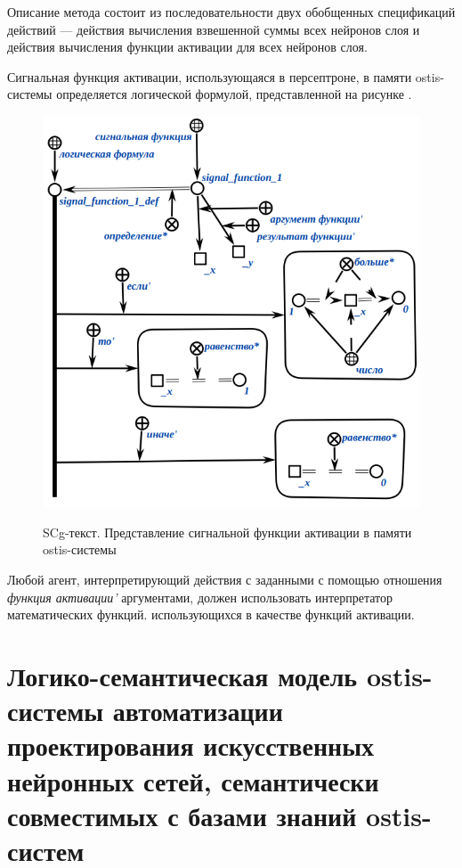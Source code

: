 Описание метода состоит из последовательности двух обобщенных спецификаций действий --- действия вычисления взвешенной суммы всех нейронов слоя и действия вычисления функции активации для всех нейронов слоя.

Сигнальная функция активации, использующаяся в персептроне, в памяти ostis-системы определяется логической формулой, представленной на рисунке \textit{}.

\begin{figure}
	\caption{SCg-текст. Представление сигнальной функции активации в памяти ostis-системы}
	\includegraphics[width=0.5\linewidth]{author/part3/figures/signal_function_def.png}
	\label{fig:signal_function_def}
\end{figure}

Любой агент, интерпретирующий действия с заданными с помощью отношения \textit{функция активации'} аргументами, должен использовать интерпретатор математических функций. использующихся в качестве функций активации.


\section{Логико-семантическая модель ostis-системы автоматизации проектирования искусственных нейронных сетей, семантически совместимых с базами знаний ostis-систем}
\label{sec_chapter_ann_framework}

